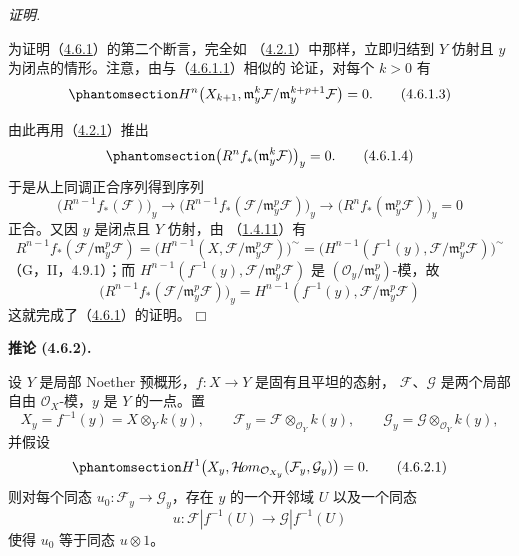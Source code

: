 \documentclass[UTF8,fontset=none,11pt,oneside,openany]{ctexbook}
\providecommand{\square}{\mdlgwhtsquare}
\newenvironment{corollary}[1][]{%
  \par\medskip\noindent\textbf{推论 (#1).}\ %
}{\par}
\newenvironment{proof}{%
  \par\smallskip\noindent\textit{证明.}\ %
}{\hfill$\square$\par}
\newcommand{\oldpage}[2][]{%
  \hypertarget{ega-source-page-#1-#2}{}%
  \marginnote{\scriptsize\textbf{#1}~|~#2}\ignorespaces}
\let\EGAOriginalLabel\label
\renewcommand{\label}[1]{\phantomsection\EGAOriginalLabel{#1}}
\begin{document}
\begin{proof}
为证明（\hyperref[III.4.6.1-fr]{4.6.1}）的第二个断言，完全如
（\hyperref[III.4.2.1-fr]{4.2.1}）中那样，立即归结到 $Y$ 仿射且 $y$
为闭点的情形。注意，由与（\hyperref[III.4.6.1.1-fr]{4.6.1.1}）相似的
论证，对每个 $k>0$ 有
\[
\label{III.4.6.1.3-fr}
H^n\bigl(X_{k+1},
\mathfrak m_y^k\mathcal F/
\mathfrak m_y^{k+p+1}\mathcal F\bigr)=0.
\tag{4.6.1.3}
\]

\oldpage[III]{141}

由此再用（\hyperref[III.4.2.1-fr]{4.2.1}）推出
\[
\label{III.4.6.1.4-fr}
\bigl(R^nf_*(\mathfrak m_y^k\mathcal F)\bigr)_y=0.
\tag{4.6.1.4}
\]
于是从上同调正合序列得到序列
\[
\bigl(R^{n-1}f_*(\mathcal F)\bigr)_y
\longrightarrow
\bigl(R^{n-1}f_*(\mathcal F/\mathfrak m_y^p\mathcal F)\bigr)_y
\longrightarrow
\bigl(R^nf_*(\mathfrak m_y^p\mathcal F)\bigr)_y=0
\]
正合。又因 $y$ 是闭点且 $Y$ 仿射，由
（\hyperref[III.1.4.11-fr]{1.4.11}）有
\[
R^{n-1}f_*(\mathcal F/\mathfrak m_y^p\mathcal F)
=\bigl(H^{n-1}(X,\mathcal F/\mathfrak m_y^p\mathcal F)\bigr)^\sim
=\bigl(H^{n-1}(f^{-1}(y),
\mathcal F/\mathfrak m_y^p\mathcal F)\bigr)^\sim
\]
（G，II，4.9.1）；而
$H^{n-1}(f^{-1}(y),\mathcal F/\mathfrak m_y^p\mathcal F)$ 是
$(\mathcal O_y/\mathfrak m_y^p)$-模，故
\[
\bigl(R^{n-1}f_*(\mathcal F/\mathfrak m_y^p\mathcal F)\bigr)_y
=H^{n-1}(f^{-1}(y),\mathcal F/\mathfrak m_y^p\mathcal F)
\]
这就完成了（\hyperref[III.4.6.1-fr]{4.6.1}）的证明。
\end{proof}

\begin{corollary}[4.6.2]
\label{III.4.6.2-fr}
设 $Y$ 是局部 Noether 预概形，$f:X\to Y$ 是固有且平坦的态射，
$\mathcal F$、$\mathcal G$ 是两个局部自由 $\mathcal O_X$-模，$y$ 是
$Y$ 的一点。置
\[
X_y=f^{-1}(y)=X\otimes_Yk(y),\qquad
\mathcal F_y=\mathcal F\otimes_{\mathcal O_Y}k(y),\qquad
\mathcal G_y=\mathcal G\otimes_{\mathcal O_Y}k(y),
\]
并假设
\[
\label{III.4.6.2.1-fr}
H^1\bigl(X_y,
\mathcal{H}\!om_{\mathcal O_{X_y}}(\mathcal F_y,\mathcal G_y)\bigr)=0.
\tag{4.6.2.1}
\]
则对每个同态 $u_0:\mathcal F_y\to\mathcal G_y$，存在 $y$ 的一个开邻域
$U$ 以及一个同态
\[
u:\mathcal F|f^{-1}(U)\longrightarrow\mathcal G|f^{-1}(U)
\]
使得 $u_0$ 等于同态 $u\otimes1$。
\end{corollary}
\end{document}
